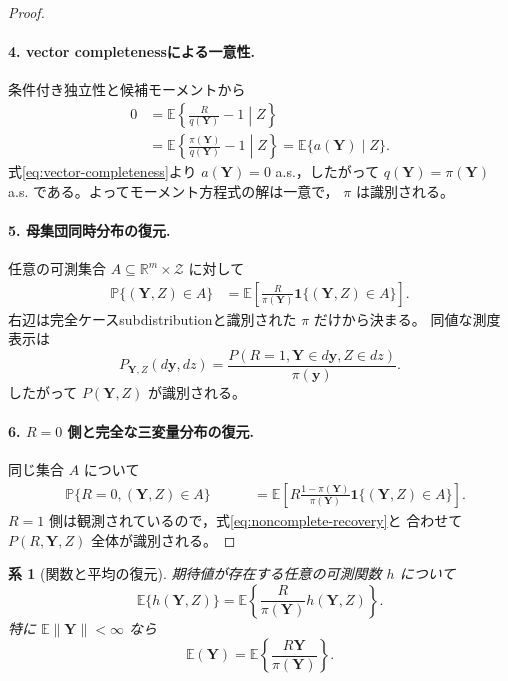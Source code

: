 \documentclass[11pt,a4paper]{article}
\newtheorem{corollary}{系}
\newcommand{\E}{\mathbb E}
\newcommand{\Prb}{\mathbb P}
\newcommand{\1}{\mathbf 1}
\newcommand{\Y}{\bm Y}
\begin{document}
\begin{proof}
\paragraph{4. vector completenessによる一意性.}
条件付き独立性と候補モーメントから
\begin{align}
 0
 &=\E\left\{\frac{R}{q(\Y)}-1\middle|Z\right\}\\
 &=\E\left\{\frac{\pi(\Y)}{q(\Y)}-1\middle|Z\right\}
 =\E\{a(\Y)\mid Z\}.
\end{align}
式\eqref{eq:vector-completeness}より $a(\Y)=0$ a.s.，したがって
$q(\Y)=\pi(\Y)$ a.s. である。よってモーメント方程式の解は一意で，
$\pi$ は識別される。

\paragraph{5. 母集団同時分布の復元.}
任意の可測集合 $A\subseteq\mathbb R^m\times\mathcal Z$ に対して
\begin{align}
 \Prb\{(\Y,Z)\in A\}
 &=\E\left[
 \frac{R}{\pi(\Y)}\1\{(\Y,Z)\in A\}
 \right].
 \label{eq:joint-recovery}
\end{align}
右辺は完全ケースsubdistributionと識別された $\pi$ だけから決まる。
同値な測度表示は
\begin{equation}
 P_{\Y,Z}(d\bm y,dz)
 =\frac{P(R=1,\Y\in d\bm y,Z\in dz)}{\pi(\bm y)}.
 \label{eq:measure-recovery}
\end{equation}
したがって $P(\Y,Z)$ が識別される。

\paragraph{6. $R=0$ 側と完全な三変量分布の復元.}
同じ集合 $A$ について
\begin{align}
 &\Prb\{R=0,(\Y,Z)\in A\}\
 &\qquad=
 \E\left[
 R\frac{1-\pi(\Y)}{\pi(\Y)}
 \1\{(\Y,Z)\in A\}
 \right].
 \label{eq:noncomplete-recovery}
\end{align}
$R=1$ 側は観測されているので，式\eqref{eq:noncomplete-recovery}と
合わせて $P(R,\Y,Z)$ 全体が識別される。
\end{proof}

\begin{corollary}[関数と平均の復元]
\label{cor:functional-recovery}
期待値が存在する任意の可測関数 $h$ について
\begin{equation}
 \E\{h(\Y,Z)\}
 =\E\left\{\frac{R}{\pi(\Y)}h(\Y,Z)\right\}.
 \end{equation}
特に $\E\|\Y\|<\infty$ なら
\begin{equation}
 \E(\Y)=\E\left\{\frac{R\Y}{\pi(\Y)}\right\}.
\end{equation}
\end{corollary}
\end{document}
